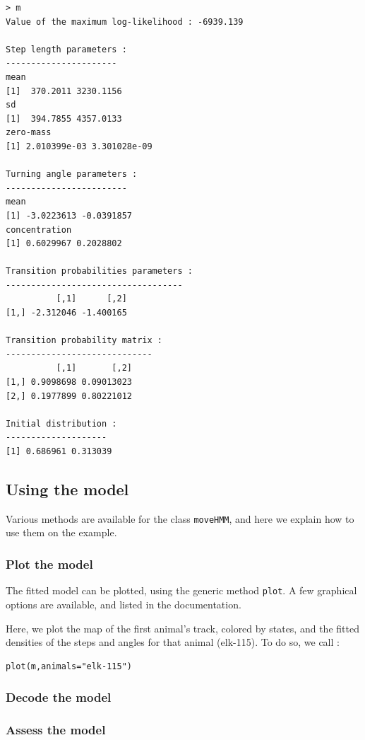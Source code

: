 \documentclass[]{article}
\begin{document}
\begin{lstlisting}
> m
Value of the maximum log-likelihood : -6939.139 

Step length parameters :
----------------------
mean 
[1]  370.2011 3230.1156
sd 
[1]  394.7855 4357.0133
zero-mass 
[1] 2.010399e-03 3.301028e-09

Turning angle parameters :
------------------------
mean 
[1] -3.0223613 -0.0391857
concentration 
[1] 0.6029967 0.2028802

Transition probabilities parameters :
-----------------------------------
          [,1]      [,2]
[1,] -2.312046 -1.400165

Transition probability matrix :
-----------------------------
          [,1]       [,2]
[1,] 0.9098698 0.09013023
[2,] 0.1977899 0.80221012

Initial distribution :
--------------------
[1] 0.686961 0.313039
\end{lstlisting}

\subsection{Using the model}
Various methods are available for the class \texttt{moveHMM}, and here we explain how to use them on the example.

\subsubsection{Plot the model}
The fitted model can be plotted, using the generic method \texttt{plot}. A few graphical options are available, and listed in the documentation.

Here, we plot the map of the first animal's track, colored by states, and the fitted densities of the steps and angles for that animal (elk-115). To do so, we call :

\begin{lstlisting}
plot(m,animals="elk-115")
\end{lstlisting}


\subsubsection{Decode the model}

\subsubsection{Assess the model}
\end{document}
